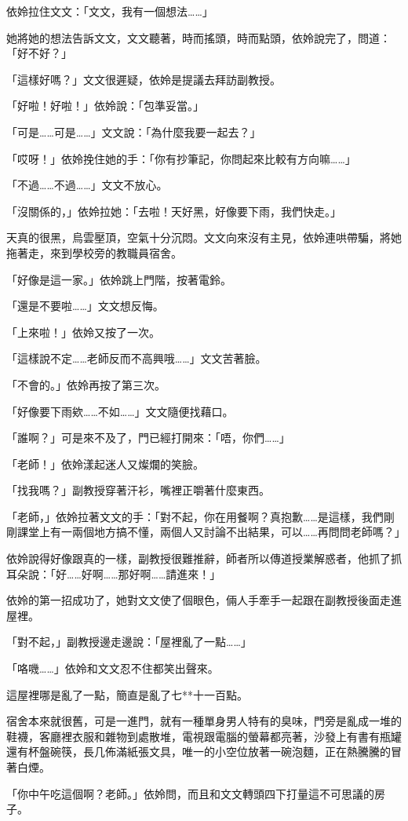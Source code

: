 依姈拉住文文：「文文，我有一個想法……」

她將她的想法告訴文文，文文聽著，時而搖頭，時而點頭，依姈說完了，問道：「好不好？」

「這樣好嗎？」文文很遲疑，依姈是提議去拜訪副教授。

「好啦！好啦！」依姈說：「包準妥當。」

「可是……可是……」文文說：「為什麼我要一起去？」

「哎呀！」依姈挽住她的手：「你有抄筆記，你問起來比較有方向嘛……」

「不過……不過……」文文不放心。

「沒關係的，」依姈拉她：「去啦！天好黑，好像要下雨，我們快走。」

天真的很黑，烏雲壓頂，空氣十分沉悶。文文向來沒有主見，依姈連哄帶騙，將她拖著走，來到學校旁的教職員宿舍。

「好像是這一家。」依姈跳上門階，按著電鈴。

「還是不要啦……」文文想反悔。

「上來啦！」依姈又按了一次。

「這樣說不定……老師反而不高興哦……」文文苦著臉。

「不會的。」依姈再按了第三次。

「好像要下雨欸……不如……」文文隨便找藉口。

「誰啊？」可是來不及了，門已經打開來：「唔，你們……」

「老師！」依姈漾起迷人又燦爛的笑臉。

「找我嗎？」副教授穿著汗衫，嘴裡正嚼著什麼東西。

「老師，」依姈拉著文文的手：「對不起，你在用餐啊？真抱歉……是這樣，我們剛剛課堂上有一兩個地方搞不懂，兩個人又討論不出結果，可以……再問問老師嗎？」

依姈說得好像跟真的一樣，副教授很難推辭，師者所以傳道授業解惑者，他抓了抓耳朵說：「好……好啊……那好啊……請進來！」

依姈的第一招成功了，她對文文使了個眼色，倆人手牽手一起跟在副教授後面走進屋裡。

「對不起，」副教授邊走邊說：「屋裡亂了一點……」

「咯嘰……」依姈和文文忍不住都笑出聲來。

這屋裡哪是亂了一點，簡直是亂了七**十一百點。

宿舍本來就很舊，可是一進門，就有一種單身男人特有的臭味，門旁是亂成一堆的鞋襪，客廳裡衣服和雜物到處散堆，電視跟電腦的螢幕都亮著，沙發上有書有瓶罐還有杯盤碗筷，長几佈滿紙張文具，唯一的小空位放著一碗泡麵，正在熱騰騰的冒著白煙。

「你中午吃這個啊？老師。」依姈問，而且和文文轉頭四下打量這不可思議的房子。

